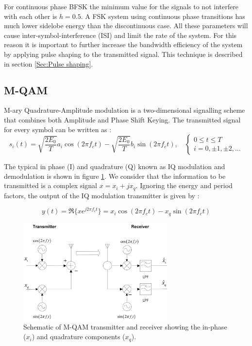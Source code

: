 \documentclass[12pt,a4paper,openright]{report}
\begin{document}
For continuous phase BFSK the minimum value for the signals to not interfere with each other is $h=0.5$. A FSK system using continuous phase transitions has much lower sidelobe energy than the discontinuous case. All these parameters will cause inter-symbol-interference (ISI) and limit the rate of the system. For this reason it is important to further increase the bandwidth efficiency of the system by applying pulse shaping to the transmitted signal. This technique is described in section \ref{Sec:Pulse shaping}. 



\subsection{M-QAM}
M-ary Quadrature-Amplitude modulation is a two-dimensional signalling scheme that combines both Amplitude and Phase Shift Keying. The transmitted signal for every symbol can be written as \cite{Proakis}:
\begin{equation}\label{Eq: MQAM symbols}
{s_i}\left( t \right) = \sqrt {\frac{{2{E_0}}}{T}} {a_i}\cos \left( {2\pi {f_c}t} \right) - \sqrt {\frac{{2{E_0}}}{T}} {b_i}\sin\left( {2\pi {f_c}t} \right), \quad \left\{ {\begin{array}{*{20}{c}}
{0 \le t \le T}\\
{i = 0, \pm 1, \pm 2, \ldots }
\end{array}} \right.
\end{equation}

The typical in phase (I) and quadrature (Q) known as IQ modulation and demodulation is shown in figure \ref{fig:iqmodem}. We consider that the information to be transmitted is a complex signal $x=x_i+jx_q$. Ignoring the energy and period factors, the output of the IQ modulation transmitter is given by \cite{Madhow}:

\begin{equation}\label{EQ: MQAM IQ}
y(t) = \Re \{ x{e^{j2\pi {f_c}t}}\}  = {x_i}\cos (2\pi {f_c}t) - {x_q}\sin (2\pi {f_c}t)
\end{equation}

 \begin{figure}[H]
  \centering
    \includegraphics[width=0.7\textwidth]{MQAMsyst.png}
    \caption[Schematic of M-QAM transmitter and receiver]{Schematic of M-QAM transmitter and receiver showing the in-phase ($x_i$) and quadrature components ($x_q$).}
    \label{fig:iqmodem}
\end{figure}
\end{document}
